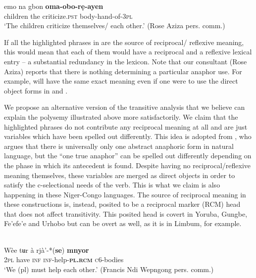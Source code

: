 \documentclass[output=paper]{langsci/langscibook}
\begin{document}
\ex
\gll emo    na    gbon     \textbf{oma-obo-rẹ-ayen} \\
       children  the  criticize.\textsc{pst}   body-hand-of-\textsc{3pl}\\
\glt   ‘The children criticize themselves/ each other.’ (Rose Aziza pers. comm.)
\z
\z

If all the highlighted phrases in  are the source of reciprocal/ reflexive meaning, this would mean that each of them would have a reciprocal and a reflexive lexical entry – a substantial redundancy in the lexicon. Note that our consultant (Rose Aziza) reports that there is nothing determining a particular anaphor use. For example,  will have the same exact meaning even if one were to use the direct object forms in  and . 

  We propose an alternative version of the transitive analysis that we believe can explain the polysemy illustrated above more satisfactorily. We claim that the highlighted phrases do not contribute any reciprocal meaning at all and are just variables which have been spelled out differently. This idea is adopted from \citet{Safir2014}, who argues that there is universally only one abstract anaphoric form in natural language, but the “one true anaphor” can be spelled out differently depending on the phase in which its antecedent is found. Despite having no reciprocal/reflexive meaning themselves, these variables are merged as direct objects in order to satisfy the c-selectional needs of the verb. This is what we claim is also happening in these Niger-Congo languages. The source of reciprocal meaning in these constructions is, instead, posited to be a reciprocal marker (RCM) head that does not affect transitivity. This posited head is covert in Yoruba, Gungbe, Fe'efe'e and Urhobo but can be overt as well, as it is in Limbum, for example.


\ea\label{ex:}
\\
\gll Wèe  tʉr  à  rjà’-*(\textbf{se})    \textbf{{mnyor}} \\
\textsc{2pl}  have  \textsc{inf}  \textsc{inf}-help-\textbf{\textsc{pl.rcm}}  \textsc{c}6-bodies \\
\glt ‘We (pl) must help each other.’ {(}Francis Ndi Wepngong pers. comm.{)} 
\z
\end{document}
